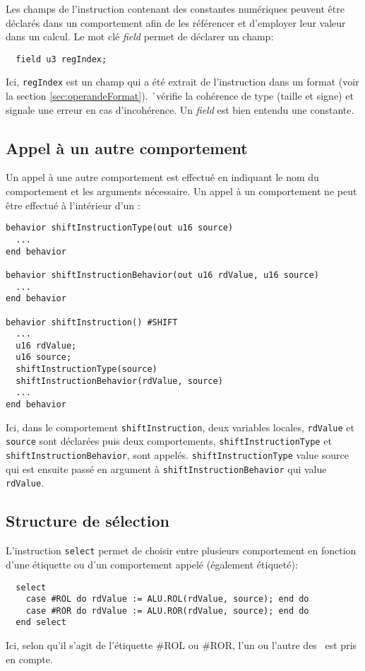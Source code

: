 Les champs de l'instruction contenant des constantes numériques peuvent être décla\-rés dans un comportement afin de les référencer et d'employer leur valeur dans un calcul. Le mot clé {\em field} permet de déclarer un champ:
\begin{lstlisting}
  field u3 regIndex;
\end{lstlisting}
Ici, {\tt regIndex} est un champ qui a été extrait de l'instruction dans un format (voir la section \ref{sec:operandeFormat}). \h\ vérifie la cohérence de type (taille et signe) et signale une erreur en cas d'incohérence. Un {\em field} est bien entendu une constante.

\subsection{Appel à un autre comportement}
\label{sec:behSubBeh}

Un appel à une autre comportement est effectué en indiquant le nom du comportement et les arguments nécessaire. Un appel à un comportement ne peut être effectué à l'intérieur d'un \blocdo :
\begin{lstlisting}
behavior shiftInstructionType(out u16 source)
  ...
end behavior

behavior shiftInstructionBehavior(out u16 rdValue, u16 source)
  ...
end behavior

behavior shiftInstruction() #SHIFT
  ...
  u16 rdValue;
  u16 source;
  shiftInstructionType(source)
  shiftInstructionBehavior(rdValue, source)
  ...
end behavior
\end{lstlisting}
Ici, dans le comportement {\tt shiftInstruction}, deux variables locales, {\tt rdValue} et {\tt source} sont déclarées puis deux comportements, {\tt shiftInstructionType} et {\tt shiftInstruction\-Behavior}, sont appelés. {\tt shiftInstructionType} value source qui est ensuite passé en argument à {\tt shiftInstructionBehavior} qui value {\tt rdValue}.

\subsection{Structure de sélection}
\label{sec:behSelect}

L'instruction {\tt select} permet de choisir entre plusieurs comportement en fonction d'une étiquette ou d'un comportement appelé (également étiqueté):
\begin{lstlisting}
  select
    case #ROL do rdValue := ALU.ROL(rdValue, source); end do
    case #ROR do rdValue := ALU.ROR(rdValue, source); end do
  end select
\end{lstlisting}
Ici, selon qu'il s'agit de l'étiquette \#ROL ou \#ROR, l'un ou l'autre des \blocsdo\ est pris en compte.

